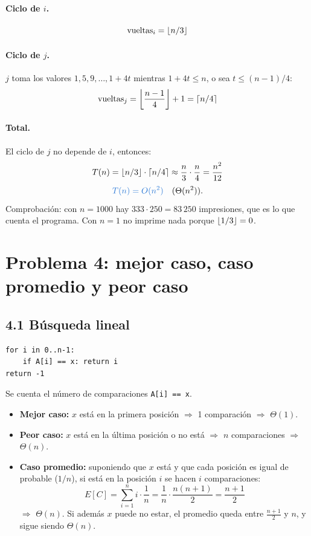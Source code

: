 \documentclass[11pt]{article}
\DeclarePairedDelimiter{\floor}{\lfloor}{\rfloor}
\DeclarePairedDelimiter{\ceil}{\lceil}{\rceil}
\newcommand{\res}[1]{\textcolor{azul}{\textbf{#1}}}
\begin{document}
\paragraph{Ciclo de $i$.}
\[
  \text{vueltas}_i = \floor{n/3}
\]

\paragraph{Ciclo de $j$.} $j$ toma los valores $1, 5, 9, \dots, 1 + 4t$ mientras
$1 + 4t \le n$, o sea $t \le (n-1)/4$:
\[
  \text{vueltas}_j = \floor*{\frac{n-1}{4}} + 1 = \ceil{n/4}
\]

\paragraph{Total.} El ciclo de $j$ no depende de $i$, entonces:
\[
  T(n) = \floor{n/3}\cdot\ceil{n/4} \approx \frac{n}{3}\cdot\frac{n}{4} = \frac{n^2}{12}
\]
\[
  \res{$T(n) = O(n^2)$} \quad (\Theta(n^2)).
\]
Comprobación: con $n = 1000$ hay $333 \cdot 250 = 83\,250$ impresiones, que es lo que cuenta el
programa. Con $n = 1$ no imprime nada porque $\floor{1/3} = 0$.

\section*{Problema 4: mejor caso, caso promedio y peor caso}

\subsection*{4.1 Búsqueda lineal}

\begin{lstlisting}
for i in 0..n-1:
    if A[i] == x: return i
return -1
\end{lstlisting}

Se cuenta el número de comparaciones \texttt{A[i] == x}.

\begin{itemize}
  \item \textbf{Mejor caso:} $x$ está en la primera posición $\Rightarrow$ 1 comparación
        $\Rightarrow$ \res{$\Theta(1)$}.
  \item \textbf{Peor caso:} $x$ está en la última posición o no está $\Rightarrow$ $n$
        comparaciones $\Rightarrow$ \res{$\Theta(n)$}.
  \item \textbf{Caso promedio:} suponiendo que $x$ está y que cada posición es igual de
        probable ($1/n$), si está en la posición $i$ se hacen $i$ comparaciones:
        \[
          E[C] = \sum_{i=1}^{n} i \cdot \frac{1}{n} = \frac{1}{n}\cdot\frac{n(n+1)}{2} = \frac{n+1}{2}
        \]
        $\Rightarrow$ \res{$\Theta(n)$}. Si además $x$ puede no estar, el promedio queda entre
        $\frac{n+1}{2}$ y $n$, y sigue siendo $\Theta(n)$.
\end{itemize}
\end{document}
